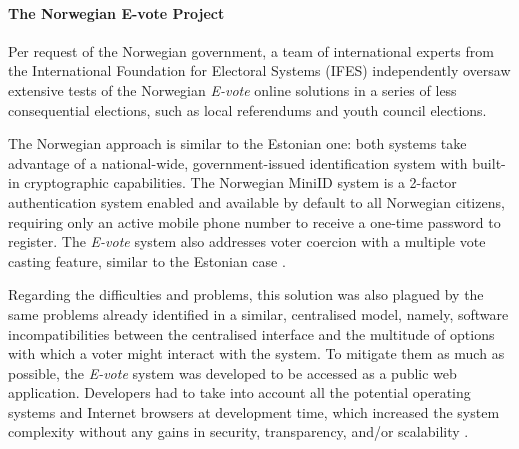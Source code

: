 \documentclass[../access.tex]{subfiles}
\begin{document}
    \paragraph{The Norwegian E-vote Project}
    Per request of the Norwegian government, a team of international experts from the International Foundation for Electoral Systems (IFES) independently oversaw extensive tests of the Norwegian \textit{E-vote} online solutions in a series of less consequential elections, such as local referendums and youth council elections.
    \par
    The Norwegian approach is similar to the Estonian one: both systems take advantage of a national-wide, government-issued identification system with built-in cryptographic capabilities. The Norwegian MiniID system is a 2-factor authentication system enabled and available by default to all Norwegian citizens, requiring only an active mobile phone number to receive a one-time password to register. The \textit{E-vote} system also addresses voter coercion with a multiple vote casting feature, similar to the Estonian case \cite{Barrat2012}.
    \par
    Regarding the difficulties and problems, this solution was also plagued by the same problems already identified in a similar, centralised model, namely, software incompatibilities between the centralised interface and the multitude of options with which a voter might interact with the system. To mitigate them as much as possible, the \textit{E-vote} system was developed to be accessed as a public web application. Developers had to take into account all the potential operating systems and Internet browsers at development time, which increased the system complexity without any gains in security, transparency, and/or scalability \cite{Binder2019}.
    
\end{document}
